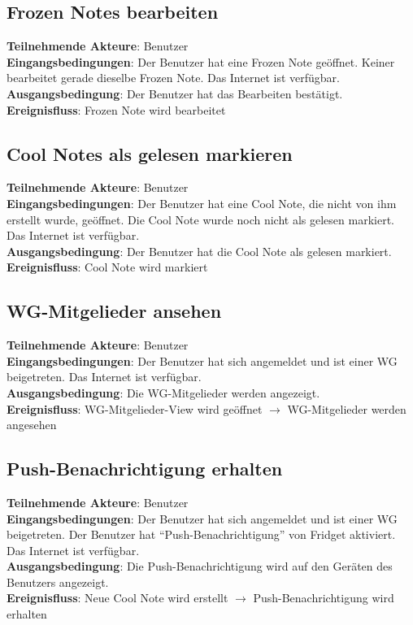 \documentclass[a4paper]{scrreprt}
\begin{document}
        	\subsection{Frozen Notes bearbeiten}
        	\textbf{Teilnehmende Akteure}: Benutzer \\
        	\textbf{Eingangsbedingungen}: Der Benutzer hat eine Frozen Note geöffnet. Keiner bearbeitet gerade dieselbe Frozen Note. Das Internet ist verfügbar. \\
        	\textbf{Ausgangsbedingung}: Der Benutzer hat das Bearbeiten bestätigt. \\
        	\textbf{Ereignisfluss}: Frozen Note wird bearbeitet
        	
        	\subsection{Cool Notes als gelesen markieren}
        	\textbf{Teilnehmende Akteure}: Benutzer \\
        	\textbf{Eingangsbedingungen}: Der Benutzer hat eine Cool Note, die nicht von ihm erstellt wurde, geöffnet. Die Cool Note wurde noch nicht als gelesen markiert. Das Internet ist verfügbar. \\
        	\textbf{Ausgangsbedingung}: Der Benutzer hat die Cool Note als gelesen markiert. \\
        	\textbf{Ereignisfluss}: Cool Note wird markiert
        	
        	\subsection{WG-Mitgelieder ansehen}
        	\textbf{Teilnehmende Akteure}: Benutzer \\
        	\textbf{Eingangsbedingungen}: Der Benutzer hat sich angemeldet und ist einer WG beigetreten. Das Internet ist verfügbar. \\
        	\textbf{Ausgangsbedingung}: Die WG-Mitgelieder werden angezeigt. \\
        	\textbf{Ereignisfluss}: WG-Mitgelieder-View wird geöffnet $\rightarrow$ WG-Mitgelieder werden angesehen
        	
        	\subsection{Push-Benachrichtigung erhalten}
        	\textbf{Teilnehmende Akteure}: Benutzer \\
        	\textbf{Eingangsbedingungen}: Der Benutzer hat sich angemeldet und ist einer WG beigetreten. Der Benutzer hat ``Push-Benachrichtigung'' von Fridget aktiviert. Das Internet ist verfügbar. \\
        	\textbf{Ausgangsbedingung}: Die Push-Benachrichtigung wird auf den Geräten des Benutzers angezeigt. \\
        	\textbf{Ereignisfluss}: Neue Cool Note wird erstellt $\rightarrow$ Push-Benachrichtigung wird erhalten
        	
\end{document}
